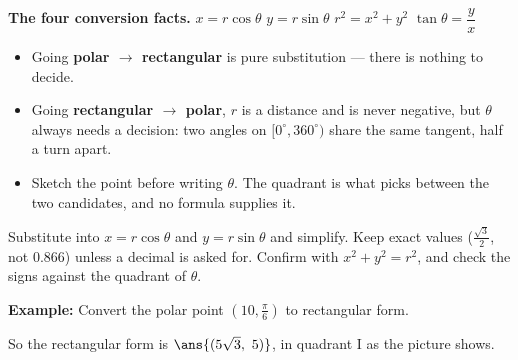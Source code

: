\documentclass[12pt]{article}
\begin{document}

\begin{formulabox}
\textbf{The four conversion facts.} \quad
$x = r\cos\theta$ \quad $y = r\sin\theta$ \quad
$r^2 = x^2 + y^2$ \quad $\tan\theta = \dfrac{y}{x}$
\begin{itemize}[leftmargin=1.1cm, itemsep=1pt, topsep=2pt]
\item Going \textbf{polar $\rightarrow$ rectangular} is pure substitution ---
there is nothing to decide.
\item Going \textbf{rectangular $\rightarrow$ polar}, $r$ is a distance and is
never negative, but $\theta$ always needs a decision: two angles on
$[0^\circ, 360^\circ)$ share the same tangent, half a turn apart.
\item Sketch the point before writing $\theta$. The quadrant is what picks
between the two candidates, and no formula supplies it.
\end{itemize}
\end{formulabox}


\begin{formulabox}
Substitute into $x = r\cos\theta$ and $y = r\sin\theta$ and simplify. Keep
exact values ($\frac{\sqrt{3}}{2}$, not $0.866$) unless a decimal is asked for.
Confirm with $x^2 + y^2 = r^2$, and check the signs against the quadrant of
$\theta$.
\end{formulabox}

\begin{examplebox}
\textbf{Example:} Convert the polar point $\left(10, \frac{\pi}{6}\right)$ to
rectangular form.
\begin{center}
\end{center}
So the rectangular form is $\ans{(5\sqrt{3},\ 5)}$, in quadrant I as the
picture shows.
\end{examplebox}
\end{document}
